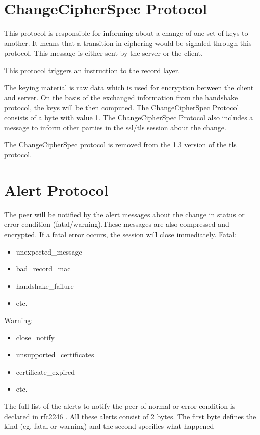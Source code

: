 \section{ChangeCipherSpec Protocol}
\label{sec:changeciphfer_protocol}
This protocol is responsible for informing about a change of one set of keys to another. It means that a transition in ciphering would be signaled through this protocol. This message is either sent by the server or the client. 

This protocol triggers an instruction to the record layer.

The keying material is raw data which is used for encryption between the client and server. On the basis of the exchanged information from the handshake protocol, the keys will be then computed.
The ChangeCipherSpec Protocol consists of a byte with value 1.
The ChangeCipherSpec Protocol also includes a message to inform other parties in the \gls{ssl}/\gls{tls} session about the change.   \cite{ms:overview}

The ChangeCipherSpec protocol is removed from the 1.3 version of the \gls{tls} protocol.
\cite{WikipediaCipher}
\section{Alert Protocol}
\label{sec:alert_protocol}
The peer will be notified by the alert messages about the change in status or error condition (fatal/warning).These messages are also compressed and encrypted. If a fatal error occurs, the session will close immediately.
Fatal:
\begin{itemize}
	\item unexpected\_message
	 \item bad\_record\_\gls{mac}
	 \item handshake\_failure 
	 \item etc.
\end{itemize}
	
Warning:
\begin{itemize}
\item close\_notify
\item unsupported\_certificates
\item certificate\_expired
\item etc.

\end{itemize}

The full list of the alerts to notify the peer of normal or error condition is declared in \gls{rfc}2246 \cite{rfc2246}. All these alerts consist of 2 bytes. The first byte defines the kind (eg. fatal or warning) and the second specifies what happened \cite{W.Stalling} \cite{ms:overview}


